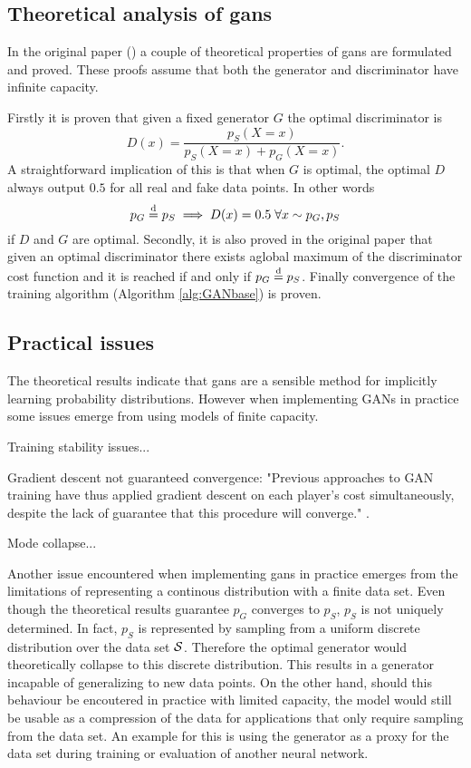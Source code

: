 \subsection{Theoretical analysis of \acrshort{gans}}
In the original paper (\textcite{goodfellow2014generative}) a couple of theoretical properties of \acrshort{gans} are formulated and proved. These proofs assume that both the generator and discriminator have infinite capacity.

Firstly it is proven that given a fixed generator $G$ the optimal discriminator is 
\begin{equation}
    D(x) = \frac{p_S(X=x)}{p_S(X=x) + p_G(X=x)}.
\end{equation}
A straightforward implication of this is that when $G$ is optimal, the optimal $D$ always output $0.5$ for all real and fake data points. In other words
\begin{equation}
    p_G \stackrel{\text{d}}{=} p_S \implies D(x) = 0.5 \; \forall x \sim p_G, p_S
\end{equation}
if $D$ and $G$ are optimal. Secondly, it is also proved in the original paper that given an optimal discriminator there exists aglobal maximum of the discriminator cost function and it is reached if and only if $p_G \stackrel{\text{d}}{=} p_S$. Finally convergence of the training algorithm (Algorithm \ref{alg:GANbase}) is proven.

\subsection{Practical issues}
The theoretical results indicate that \acrshort{gans} are a sensible method for implicitly learning probability distributions. However when implementing GANs in practice some issues emerge from using models of finite capacity. 

Training stability issues...

Gradient descent not guaranteed convergence: "Previous approaches to GAN training have thus applied gradient descent on each player’s cost simultaneously, despite the lack of guarantee that this procedure will converge." \textcite{salimans2016improved}.

Mode collapse...

Another issue encountered when implementing \acrshort{gans} in practice emerges from the limitations of representing a continous distribution with a finite data set. Even though the theoretical results guarantee $p_G$ converges to $p_S$, $p_S$ is not uniquely determined. In fact, $p_S$ is represented by sampling from a uniform discrete distribution over the data set $\mathcal{S}$. Therefore the optimal generator would theoretically collapse to this discrete distribution. This results in a generator incapable of generalizing to new data points. On the other hand, should this behaviour be encoutered in practice with limited capacity, the model would still be usable as a compression of the data for applications that only require sampling from the data set. An example for this is using the generator as a proxy for the data set during training or evaluation of another neural network.

